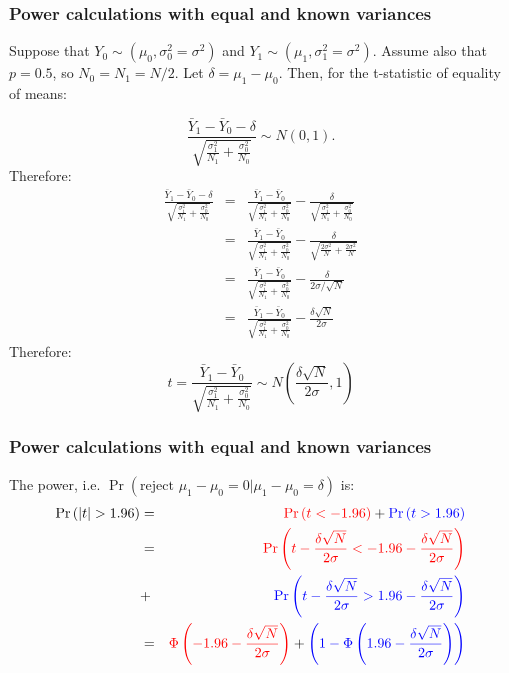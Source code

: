 \documentclass{beamer}
\numberwithin{equation}{section}
\begin{document}
 \begin{frame}
\frametitle{Power calculations with equal and known variances}
\tiny
Suppose that $Y_0 \sim (\mu_0, \sigma^2_0=\sigma^2)$ and $Y_1 \sim (\mu_1, \sigma^2_1=\sigma^2)$. Assume also that $p=0.5$, so $N_0=N_1=N/2$. Let $\delta=\mu_1-\mu_0$. Then, for the t-statistic of equality of means:

\[
\frac{\bar Y_1 - \bar Y_0-\delta}{\sqrt{\displaystyle\frac{\sigma^2_1}{N_1}+\displaystyle\frac{\sigma^2_0}{N_0}}} \sim
 N \left(0,1\right).
\]
Therefore:
\begin{eqnarray*}
\frac{\bar Y_1 - \bar Y_0-\delta}{\sqrt{\displaystyle\frac{\sigma^2_1}{N_1}+\displaystyle\frac{\sigma^2_0}{N_0}}} &=& \frac{\bar Y_1 - \bar Y_0}{\sqrt{\displaystyle\frac{\sigma^2_1}{N_1}+\displaystyle\frac{\sigma^2_0}{N_0}}} - \frac{\delta}{\sqrt{\displaystyle\frac{\sigma^2_1}{N_1}+\displaystyle\frac{\sigma^2_0}{N_0}}} \\
&=& \frac{\bar Y_1 - \bar Y_0}{\sqrt{\displaystyle\frac{\sigma^2_1}{N_1}+\displaystyle\frac{\sigma^2_0}{N_0}}} - \frac{\delta}{\sqrt{\displaystyle\frac{2\sigma^2}{N}+\displaystyle\frac{2\sigma^2}{N}}}\\
&=& \frac{\bar Y_1 - \bar Y_0}{\sqrt{\displaystyle\frac{\sigma^2_1}{N_1}+\displaystyle\frac{\sigma^2_0}{N_0}}} - \frac{\delta}{2\sigma/\sqrt{N}} \\
&=& \frac{\bar Y_1 - \bar Y_0}{\sqrt{\displaystyle\frac{\sigma^2_1}{N_1}+\displaystyle\frac{\sigma^2_0}{N_0}}} - \frac{\delta \sqrt{N} }{2\sigma }
\end{eqnarray*}
Therefore:
\[
t=\frac{\bar Y_1 - \bar
  Y_0}{\sqrt{\displaystyle\frac{\sigma^2_1}{N_1}+\displaystyle\frac{\sigma^2_0}{N_0}}}
\sim N\left(\frac{\delta\sqrt{N}}{2\sigma},1\right)
\]

\end{frame}

 \begin{frame}
\frametitle{Power calculations with equal and known variances}

The power, i.e. $\Pr\left(\mbox{reject } \mu_1-\mu_0=0 | \mu_1-\mu_0=\delta\right)$ is:
\begin{eqnarray*}
\Pr\left(|t|>1.96\right)&=&\textcolor{red}{\Pr\left(t<-1.96\right)}+\textcolor{blue}{\Pr\left(t>1.96\right)}\\
&=&\textcolor{red}{\Pr\left(t-\frac{\delta\sqrt N}{2\sigma}<-1.96-\frac{\delta\sqrt N}{2\sigma}\right)}\\
&+&\textcolor{blue}{\Pr\left(t-\frac{\delta\sqrt N}{2\sigma}>1.96-\frac{\delta\sqrt N}{2\sigma}\right)}\\
&=&\textcolor{red}{\Phi\left(-1.96-\frac{\delta\sqrt N}{2\sigma}\right)} + \textcolor{blue}{
\left(1-\Phi\left(1.96-\frac{\delta\sqrt N}{2\sigma}\right)\right)}
\end{eqnarray*}

\end{frame}
\end{document}
